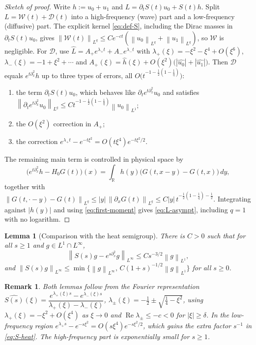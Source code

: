 \documentclass[11pt]{amsart}
\newtheorem{lemma}{Lemma}[section]
\newtheorem{remark}{Remark}[section]
\theoremstyle{definition}
\theoremstyle{remark}
\numberwithin{equation}{section}
\newcommand{\R}{{\mathbb R}}
\newcommand{\pt}{\partial}
\newcommand{\norm}[1]{\left\lVert #1\right\rVert}
\begin{document}
\begin{proof}[Sketch of proof]
Write $h:=u_0+u_1$ and $L=\pt_tS(t)u_0+S(t)h$. Split
$L=\mathcal W(t)+\mathcal D(t)$ into a high-frequency (wave) part and a
low-frequency (diffusive) part. The explicit kernel \eqref{eq:def-S}, including
the Dirac masses in $\pt_tS(t)u_0$, gives
$\norm{\mathcal W(t)}_{L^q}\le Ce^{-ct}(\norm{u_0}_{L^q}+\norm{u_1}_{L^q})$,
so $\mathcal W$ is negligible. For $\mathcal D$, use
$\widehat{L}=A_+e^{\lambda_+t}+A_-e^{\lambda_-t}$ with
$\lambda_+(\xi)=-\xi^2-\xi^4+O(\xi^6)$, $\lambda_-(\xi)=-1+\xi^2+\cdots$ and
$A_+(\xi)=\widehat h(\xi)+O(\xi^2)\bigl(|\widehat{u_0}|+|\widehat{u_1}|\bigr)$.
Then $\mathcal D$ equals $e^{t\pt_x^2}h$ up to three types of errors, all
$O\bigl(t^{-1-\frac12(1-\frac1q)}\bigr)$:
\begin{enumerate}
\item the term $\pt_tS(t)u_0$, which behaves like $\pt_te^{t\pt_x^2}u_0$ and satisfies
$\norm{\pt_te^{t\pt_x^2}u_0}_{L^q}\le Ct^{-1-\frac12(1-\frac1q)}\norm{u_0}_{L^1}$;
\item the $O(\xi^2)$ correction in $A_+$;
\item the correction $e^{\lambda_+t}-e^{-t\xi^2}=O(t\xi^4)e^{-t\xi^2/2}$.
\end{enumerate}
The remaining main term is controlled in physical space by
\[
\bigl(e^{t\pt_x^2}h-H_0G(t)\bigr)(x)
=\int_{\R}h(y)\bigl(G(t,x-y)-G(t,x)\bigr)\,dy,
\]
together with
$\norm{G(t,\cdot-y)-G(t)}_{L^q}\le |y|\,\norm{\pt_xG(t)}_{L^q}
\le C|y|\,t^{-\frac12(1-\frac1q)-\frac12}$. Integrating against $|h(y)|$ and
using \eqref{eq:first-moment} gives \eqref{eq:L-asympt}, including $q=1$ with no logarithm.
\end{proof}

\begin{lemma}[Comparison with the heat semigroup]\label{lem:heat}
There is $C>0$ such that for all $s\ge1$ and $g\in L^1\cap L^\infty$,
\begin{equation}\label{eq:S-heat}
\norm{S(s)g-e^{s\pt_x^2}g}_{L^\infty}\le C s^{-3/2}\norm{g}_{L^1},
\end{equation}
and $\norm{S(s)g}_{L^\infty}\le \min\{\norm{g}_{L^\infty},\,C(1+s)^{-1/2}\norm{g}_{L^1}\}$
for all $s\ge0$.
\end{lemma}

\begin{remark}
Both lemmas follow from the Fourier representation
$\widehat{S(s)}(\xi)=\dfrac{e^{\lambda_+(\xi)s}-e^{\lambda_-(\xi)s}}{\lambda_+(\xi)-\lambda_-(\xi)}$,
$\lambda_\pm(\xi)=-\tfrac12\pm\sqrt{\tfrac14-\xi^2}$, using
$\lambda_+(\xi)=-\xi^2+O(\xi^4)$ as $\xi\to0$ and $\operatorname{Re}\lambda_\pm\le -c<0$
for $|\xi|\ge\delta$. In the low-frequency region
$e^{\lambda_+ s}-e^{-s\xi^2}=O(s\xi^4)e^{-s\xi^2/2}$, which gains the
extra factor $s^{-1}$ in \eqref{eq:S-heat}. The high-frequency part is
exponentially small for $s\ge1$.
\end{remark}
\end{document}
